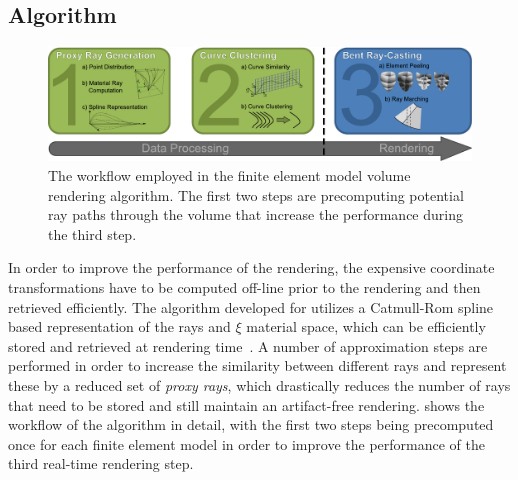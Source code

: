 \subsection{Algorithm} \label{contributions:fem:algorithm}
\begin{figure}
\centering
\includegraphics[width=\textwidth]{figures/contributions/fem/workflow.pdf}
\caption{The workflow employed in the finite element model volume rendering algorithm.  The first two steps are precomputing potential ray paths through the volume that increase the performance during the third step.}
\label{contributions:fem:workflow}
\end{figure}

In order to improve the performance of the rendering, the expensive coordinate transformations have to be computed off-line prior to the rendering and then retrieved efficiently.  The algorithm developed for  utilizes a Catmull-Rom spline based representation of the rays and $\xi$ material space, which can be efficiently stored and retrieved at rendering time~\cite{catmull1974class}.  A number of approximation steps are performed in order to increase the similarity between different rays and represent these by a reduced set of \emph{proxy rays}, which drastically reduces the number of rays that need to be stored and still maintain an artifact-free rendering.   shows the workflow of the algorithm in detail, with the first two steps being precomputed once for each finite element model in order to improve the performance of the third real-time rendering step.


